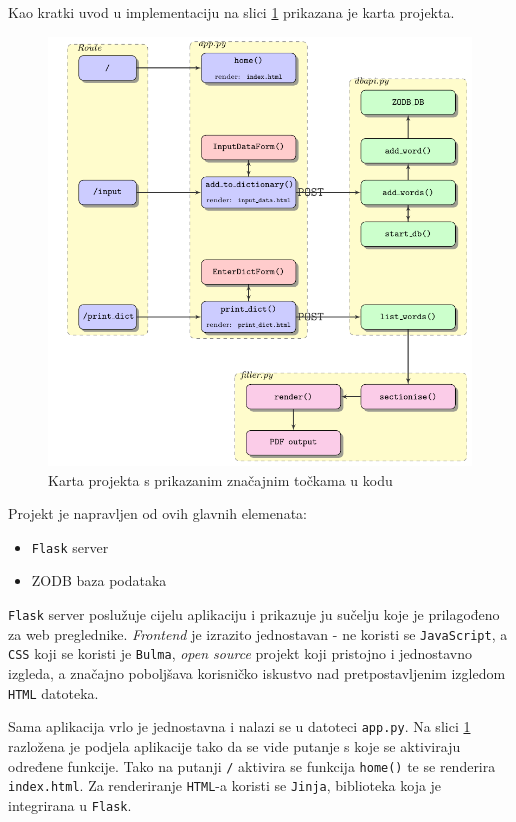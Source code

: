 \documentclass{foi}
\begin{document}
Kao kratki uvod u implementaciju na slici \ref{project_diagram} prikazana je
karta projekta.

\begin{figure}[!h]
	\centering
	\includegraphics{project_diagram.pdf}
	\caption{Karta projekta s prikazanim značajnim točkama u kodu}
	\label{project_diagram}
\end{figure}

Projekt je napravljen od ovih glavnih elemenata:
\begin{itemize}
	\item \texttt{Flask} server
	\item ZODB baza podataka
\end{itemize}

\texttt{Flask} server poslužuje cijelu aplikaciju i prikazuje ju sučelju koje
je prilagođeno za web preglednike. \textit{Frontend} je izrazito jednostavan -
ne koristi se \texttt{JavaScript}, a \texttt{CSS} koji se koristi je
\texttt{Bulma}, \textit{open source} projekt koji pristojno i jednostavno
izgleda, a značajno poboljšava korisničko iskustvo nad pretpostavljenim
izgledom \texttt{HTML} datoteka.

Sama aplikacija vrlo je jednostavna i nalazi se u datoteci \texttt{app.py}. Na
slici \ref{project_diagram} razložena je podjela aplikacije tako da se vide putanje s koje
se aktiviraju određene funkcije. Tako na putanji \texttt{/} aktivira se funkcija
\texttt{home()} te se renderira \texttt{index.html}. Za renderiranje
\texttt{HTML}-a koristi se \texttt{Jinja}, biblioteka koja je integrirana u
\texttt{Flask}.
\end{document}
